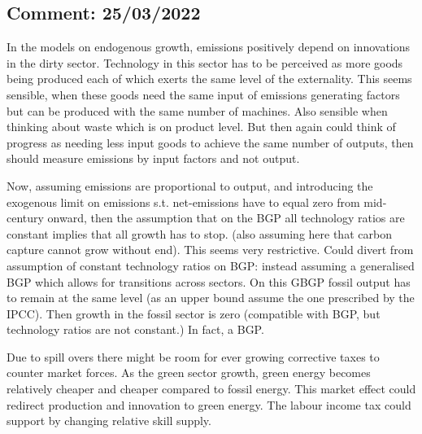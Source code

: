
\subsection*{Comment: 25/03/2022}
In the models on endogenous growth, emissions positively depend on innovations in the dirty sector. Technology in this sector has to be perceived as more goods being produced each of which exerts the same level of the externality. This seems sensible, when these goods need the same input of emissions generating factors but can be produced with the same number of machines. Also sensible when thinking about waste which is on product level. But then again could think of progress as needing less input goods to achieve the same number of outputs, then should measure emissions by input factors and not output. 

Now, assuming emissions are proportional to output, and introducing the exogenous limit on emissions s.t. net-emissions have to equal zero from mid-century onward, then the assumption that on the BGP all technology ratios are constant implies that all growth has to stop. (also assuming here that carbon capture cannot grow without end). This seems very restrictive. Could divert from assumption of constant technology ratios on BGP: instead assuming a generalised BGP which allows for transitions across sectors.  On this GBGP fossil output has to remain at the same level (as an upper bound assume the one prescribed by the IPCC). Then growth in the fossil sector is zero (compatible with BGP, but technology ratios are not constant.) In fact, a BGP. 

Due to spill overs there might be room for ever growing corrective taxes to counter market forces. 
As the green sector growth, green energy becomes relatively cheaper and cheaper compared to fossil energy. This market effect could redirect production and innovation to green energy. 
The labour income tax could support by changing relative skill supply. 

